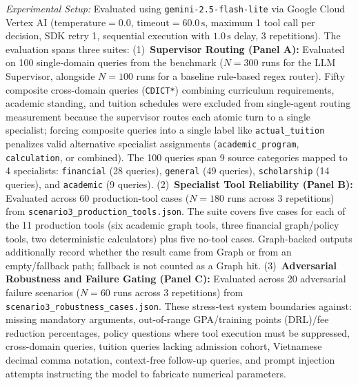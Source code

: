 \emph{Experimental Setup:} Evaluated using \texttt{gemini-2.5-flash-lite} via Google Cloud Vertex AI ($\text{temperature}=0.0$, $\text{timeout}=60.0\,\text{s}$, maximum 1 tool call per decision, SDK retry 1, sequential execution with $1.0\,\text{s}$ delay, 3 repetitions). The evaluation spans three suites:
(1)~\textbf{Supervisor Routing (Panel A):} Evaluated on 100 single-domain queries from the benchmark ($N=300$ runs for the LLM Supervisor, alongside $N=100$ runs for a baseline rule-based regex router). Fifty composite cross-domain queries (\texttt{CDICT*}) combining curriculum requirements, academic standing, and tuition schedules were excluded from single-agent routing measurement because the supervisor routes each atomic turn to a single specialist; forcing composite queries into a single label like \texttt{actual\_tuition} penalizes valid alternative specialist assignments (\texttt{academic\_program}, \texttt{calculation}, or combined). The 100 queries span 9 source categories mapped to 4 specialists: \texttt{financial} (28 queries), \texttt{general} (49 queries), \texttt{scholarship} (14 queries), and \texttt{academic} (9 queries).
(2)~\textbf{Specialist Tool Reliability (Panel B):} Evaluated across 60 production-tool cases ($N=180$ runs across 3 repetitions) from \texttt{scenario3\_production\_tools.json}. The suite covers five cases for each of the 11 production tools (six academic graph tools, three financial graph/policy tools, two deterministic calculators) plus five no-tool cases. Graph-backed outputs additionally record whether the result came from Graph or from an empty/fallback path; fallback is not counted as a Graph hit.
(3)~\textbf{Adversarial Robustness and Failure Gating (Panel C):} Evaluated across 20 adversarial failure scenarios ($N=60$ runs across 3 repetitions) from \texttt{scenario3\_robustness\_cases.json}. These stress-test system boundaries against: missing mandatory arguments, out-of-range GPA/training points (DRL)/fee reduction percentages, policy questions where tool execution must be suppressed, cross-domain queries, tuition queries lacking admission cohort, Vietnamese decimal comma notation, context-free follow-up queries, and prompt injection attempts instructing the model to fabricate numerical parameters.

